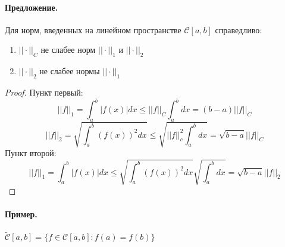 \paragraph{Предложение.} Для норм, введенных на линейном пространстве $ \mathcal{C}[a,b] $ справедливо:
\begin{enumerate}
	\item $  ||\cdot||_C $ не слабее норм $ ||\cdot||_1  $ и $ ||\cdot||_2 $
	\item $ ||\cdot||_2 $ не слабее нормы $ ||\cdot||_1 $
\end{enumerate}
\begin{proof}
	Пункт первый:
	\[
	||f||_1 = \int_{a}^{b} |f(x)|dx \leqslant ||f||_C\int_{a}^{b}dx = (b-a)||f||_C
	\]
	\[
	||f||_2 = \sqrt{\int_{a}^{b}(f(x))^2dx}\leqslant\sqrt{||f||_c^2 \int_{a}^{b}dx}=\sqrt{b-a}||f||_C
	\]
	Пункт второй:
	\[
	||f||_1 = \int_{a}^{b}|f(x)|dx\leqslant\sqrt{\int_{a}^{b}(f(x))^2dx}\sqrt{\int_{a}^{b}dx} = \sqrt{b-a}||f||_2
	\]
\end{proof}
\paragraph{Пример.}
$ \tilde{\mathcal{C}}[a,b] = \{ f\in\mathcal{C}[a,b]:f(a)=f(b) \} $

